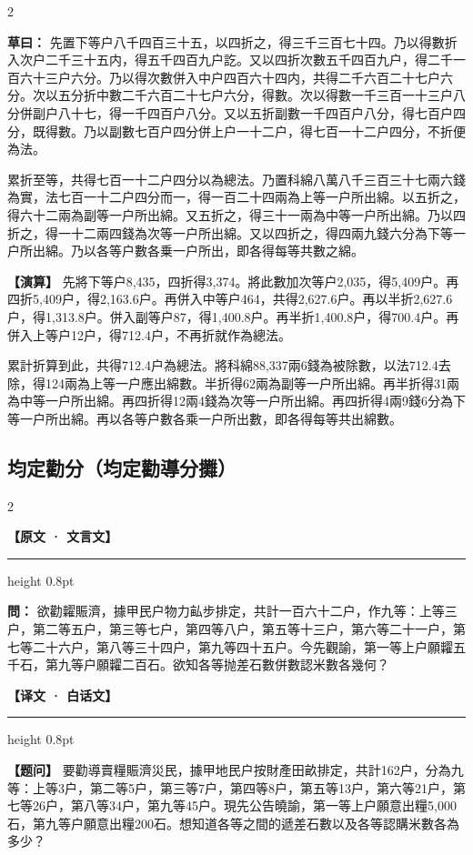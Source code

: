 \documentclass[11pt,a4paper]{article}
\newcommand{\ClassicalQuestion}[1]{\par\noindent\textbf{\color{problemcolor}問：}#1\par}
\newcommand{\ClassicalWorking}[1]{\par\noindent\textbf{草曰：}#1\par}
\newcommand{\ModernQuestion}[1]{\par\noindent\textbf{\color{modernlabel}【题问】}#1\par}
\newcommand{\ModernWorking}[1]{\par\noindent\textbf{【演算】}#1\par}
\newcommand{\ClassicalHeader}{%
  \begin{center}\textbf{\color{headerclassical}【原文 · 文言文】}\end{center}
  \vspace{-0.5em}
  \hrule height 0.8pt
  \vspace{0.5em}
}
\newcommand{\ModernHeader}{%
  \begin{center}\textbf{\color{headermodern}【译文 · 白话文】}\end{center}
  \vspace{-0.5em}
  \hrule height 0.8pt
  \vspace{0.5em}
}
\begin{document}
\begin{paracol}{2}

\ClassicalWorking{%
先置下等户八千四百三十五，以四折之，得三千三百七十四。乃以得數折入次户二千三十五内，得五千四百九户訖。又以四折次數五千四百九户，得二千一百六十三户六分。乃以得次數併入中户四百六十四内，共得二千六百二十七户六分。次以五分折中數二千六百二十七户六分，得數。次以得數一千三百一十三户八分併副户八十七，得一千四百户八分。又以五折副數一千四百户八分，得七百户四分，既得數。乃以副數七百户四分併上户一十二户，得七百一十二户四分，不折便為法。

累折至等，共得七百一十二户四分以為總法。乃置科綿八萬八千三百三十七兩六錢為實，法七百一十二户四分而一，得一百二十四兩為上等一户所出綿。以五折之，得六十二兩為副等一户所出綿。又五折之，得三十一兩為中等一户所出綿。乃以四折之，得一十二兩四錢為次等一户所出綿。又以四折之，得四兩九錢六分為下等一户所出綿。乃以各等户數各乗一户所出，即各得每等共數之綿。}

\switchcolumn

\ModernWorking{%
先將下等户8,435，四折得3,374。將此數加次等户2,035，得5,409户。再四折5,409户，得2,163.6户。再併入中等户464，共得2,627.6户。再以半折2,627.6户，得1,313.8户。併入副等户87，得1,400.8户。再半折1,400.8户，得700.4户。再併入上等户12户，得712.4户，不再折就作為總法。

累計折算到此，共得712.4户為總法。將科綿88,337兩6錢為被除數，以法712.4去除，得124兩為上等一户應出綿數。半折得62兩為副等一户所出綿。再半折得31兩為中等一户所出綿。再四折得12兩4錢為次等一户所出綿。再四折得4兩9錢6分為下等一户所出綿。再以各等户數各乘一户所出數，即各得每等共出綿數。
}

\end{paracol}

\subsection*{\color{sectioncolor}均定勸分（均定勸導分攤）}

\begin{paracol}{2}

\ClassicalHeader

\ClassicalQuestion{%
欲勸糶賑濟，據甲民户物力畆步排定，共計一百六十二户，作九等：上等三户，第二等五户，第三等七户，第四等八户，第五等十三户，第六等二十一户，第七等二十六户，第八等三十四户，第九等四十五户。今先觀諭，第一等上户願糶五千石，第九等户願糶二百石。欲知各等抛差石數併數認米數各幾何？}

\switchcolumn

\ModernHeader

\ModernQuestion{%
要勸導賣糧賑濟災民，據甲地民户按財產田畝排定，共計162户，分為九等：上等3户，第二等5户，第三等7户，第四等8户，第五等13户，第六等21户，第七等26户，第八等34户，第九等45户。現先公告曉諭，第一等上户願意出糧5,000石，第九等户願意出糧200石。想知道各等之間的遞差石數以及各等認購米數各為多少？
}

\end{paracol}
\end{document}
